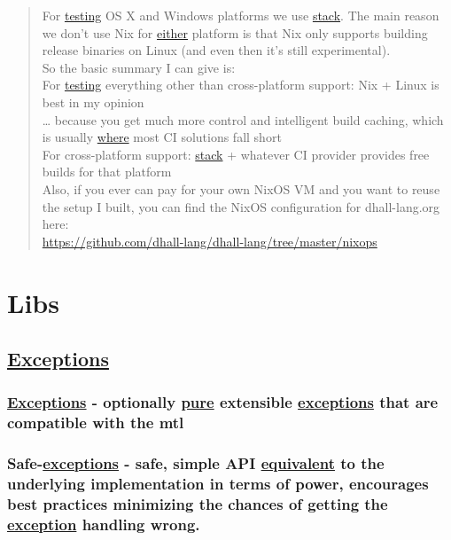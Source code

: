 \documentclass[a4paper,14pt,oneside]{book}
\begin{document}
{\begin{quote}
For \hyperref[orgbafa85b]{testing} OS X and Windows platforms we use \hyperref[org507f473]{stack}. The main reason we don't use Nix for \hyperref[org25321ee]{either} platform is that Nix only supports building release binaries on Linux (and even then it's still experimental).\\

So the basic summary I can give is:\\

For \hyperref[orgbafa85b]{testing} everything other than cross-platform support: Nix + Linux is best in my opinion\\

\ldots{} because you get much more control and intelligent build caching, which is usually \hyperref[org5b6b021]{where} most CI solutions fall short\\

For cross-platform support: \hyperref[org507f473]{stack} + whatever CI provider provides free builds for that platform\\

Also, if you ever can pay for your own NixOS VM and you want to reuse the setup I built, you can find the NixOS configuration for dhall-lang.org here:\\

\url{https://github.com/dhall-lang/dhall-lang/tree/master/nixops}\\
\end{quote}

\part{Libs}
\label{sec:orgbcdc46c}
\chapter{\hyperref[orgb5f6f11]{Exceptions}}
\label{sec:org56dc361}

\section{\hyperref[orgb5f6f11]{Exceptions} - optionally \hyperref[org1ebaedd]{pure} extensible \hyperref[orgb5f6f11]{exceptions} that are compatible with the mtl}
\label{sec:org7f0701c}
\section{Safe-\hyperref[orgb5f6f11]{exceptions} - safe, simple API \hyperref[orgfc48fc8]{equivalent} to the underlying implementation in terms of power, encourages best practices minimizing the chances of getting the \hyperref[org617291e]{exception} handling wrong.}
\label{sec:org54d7e76}
}
\end{document}

